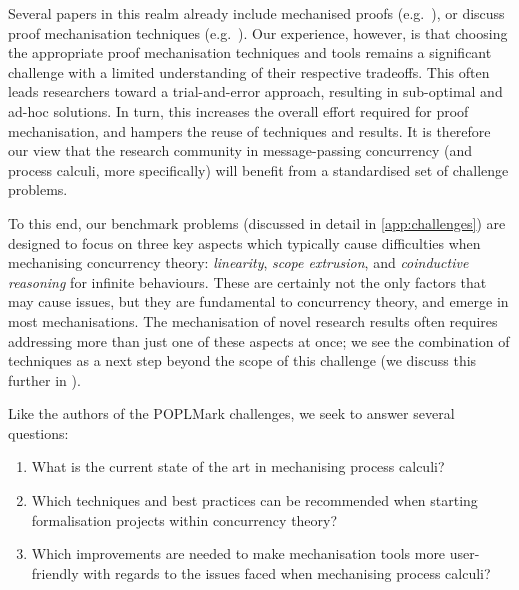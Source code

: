 \documentclass[runningheads]{llncs}
\begin{document}
Several papers in this realm already include mechanised proofs
(e.g.~\cite{Castro-Perez2021,Castro2020,lmcs:9985,
  DBLP:journals/jar/CruzFilipeMP23, Tirore:2023}), or discuss proof mechanisation techniques
(e.g.~\cite{Bengtson2016, Gay2001,
  Thiemann2019, DBLP:conf/forte/ZalakainD21}).  Our
experience, however, is that choosing the appropriate proof mechanisation techniques and 
tools remains a significant challenge with a limited understanding of their 
respective tradeoffs.  This often leads researchers toward a trial-and-error approach, 
resulting in sub-optimal and ad-hoc solutions. In turn, this increases the overall effort 
required for proof mechanisation, and hampers the reuse of techniques and results.
%
It is therefore our view that the research community in message-passing
concurrency (and process calculi, more specifically) will benefit from a standardised set
of challenge problems.

To this end, our benchmark problems (discussed in detail in \cref{app:challenges}) are designed to focus on three key aspects which typically cause difficulties 
when mechanising concurrency theory: \emph{linearity}, \emph{scope extrusion}, 
and \emph{coinductive reasoning} for infinite behaviours. These are certainly not the only factors that may cause issues, but they
are fundamental to concurrency theory, and emerge in most mechanisations.
The mechanisation of novel research results often requires addressing more than
just one of these aspects at once; we see the combination of techniques
as a next step beyond the scope of this challenge (we discuss this further in
).

Like the authors of the POPLMark challenges, we seek to
answer several questions:
\begin{enumerate}[label=\textbf{(Q\arabic*)},leftmargin=10mm]
\item\label{item:rq1} What is the current state of the art in mechanising process calculi?
\item\label{item:rq2} Which techniques and best practices can be recommended when starting formalisation projects within concurrency theory?
\item\label{item:rq3} Which improvements are needed to make mechanisation tools more user-friendly with regards to the issues faced when mechanising process calculi?
\end{enumerate}
\end{document}
